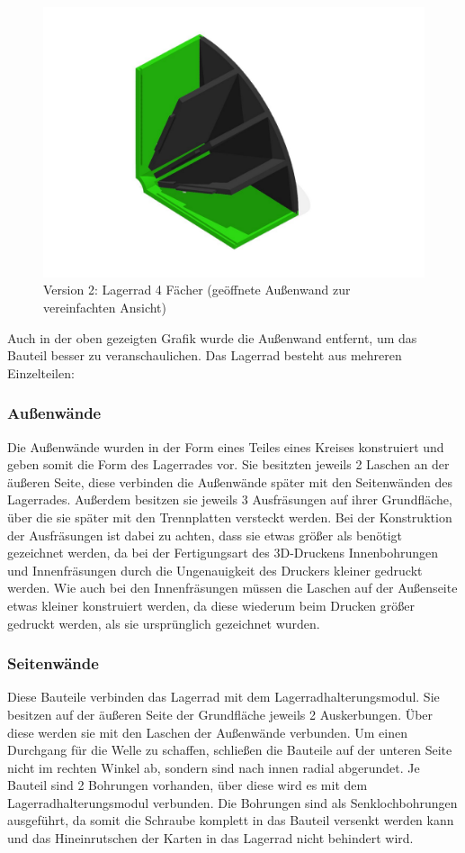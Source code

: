 \begin{figure}[H]
    \centering
    \includegraphics[scale=0.5,page=1]{fig/mech/LagerRad4F}
    \caption{Version 2: Lagerrad 4 Fächer (geöffnete Außenwand zur vereinfachten Ansicht)}
\end{figure}


Auch in der oben gezeigten Grafik wurde die Außenwand entfernt, um das Bauteil besser zu veranschaulichen.
Das Lagerrad besteht aus mehreren Einzelteilen:

\subsubsection{Außenwände}
Die Außenwände wurden in der Form eines Teiles eines Kreises konstruiert und geben somit die Form des Lagerrades vor. Sie besitzten jeweils 2 Laschen an der äußeren Seite, diese verbinden die Außenwände später mit den Seitenwänden des Lagerrades.
Außerdem besitzen sie jeweils 3 Ausfräsungen auf ihrer Grundfläche, über die sie später mit den Trennplatten versteckt werden. Bei der Konstruktion der Ausfräsungen ist dabei zu achten, dass sie etwas größer als benötigt gezeichnet werden, da bei der
Fertigungsart des 3D-Druckens Innenbohrungen und Innenfräsungen durch die Ungenauigkeit des Druckers kleiner gedruckt werden. Wie auch bei den Innenfräsungen müssen die Laschen auf der Außenseite etwas kleiner konstruiert werden, da diese wiederum beim
Drucken größer gedruckt werden, als sie ursprünglich gezeichnet wurden.

\subsubsection{Seitenwände}
Diese Bauteile verbinden das Lagerrad mit dem Lagerradhalterungsmodul. Sie besitzen auf der äußeren Seite der Grundfläche
jeweils 2 Auskerbungen. Über diese werden sie mit den Laschen der Außenwände verbunden. Um einen Durchgang für die Welle zu schaffen,
schließen die Bauteile auf der unteren Seite nicht im rechten Winkel ab, sondern sind nach innen radial abgerundet.
Je Bauteil sind 2 Bohrungen vorhanden, über diese wird es mit dem Lagerradhalterungsmodul verbunden.
Die Bohrungen sind als Senklochbohrungen ausgeführt, da somit die Schraube komplett in das Bauteil versenkt werden kann
 und das Hineinrutschen der Karten in das Lagerrad nicht behindert wird.

